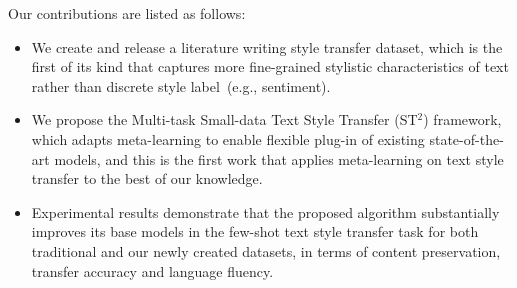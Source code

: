 Our contributions are listed as follows:
\begin{itemize}
	\item We create and release a literature writing style transfer dataset, which is the first of its kind that captures more fine-grained stylistic characteristics of text rather than discrete style label~(e.g., sentiment).
	\item We propose the Multi-task Small-data Text Style Transfer (ST$^2$) framework, which adapts meta-learning to enable flexible plug-in of existing state-of-the-art models, and this is the first work that applies meta-learning on text style transfer to the best of our knowledge.
	\item Experimental results demonstrate that the proposed algorithm substantially improves its base models in the few-shot text style transfer task for both traditional and our newly created datasets, in terms of content preservation, transfer accuracy and language fluency.

\end{itemize}



